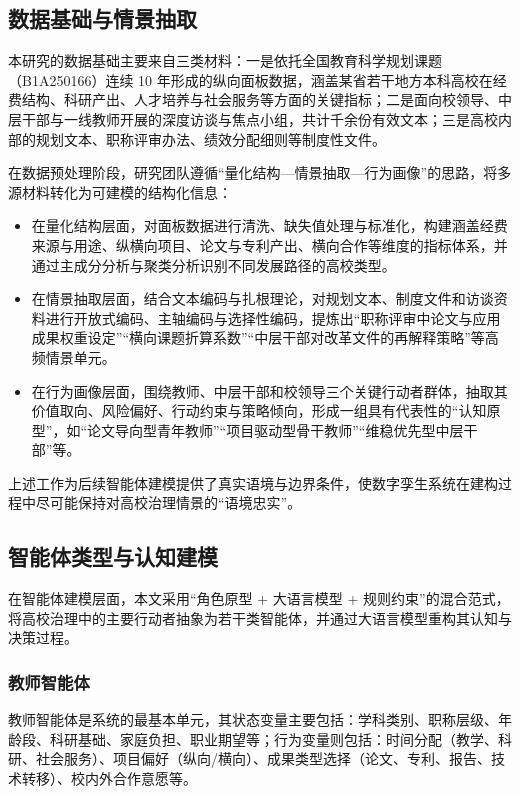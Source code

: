 \documentclass[UTF8, zihao=-4, fontset=mac]{ctexart}
\begin{document}
\subsection{数据基础与情景抽取}

本研究的数据基础主要来自三类材料：一是依托全国教育科学规划课题（B1A250166）连续 10 年形成的纵向面板数据，涵盖某省若干地方本科高校在经费结构、科研产出、人才培养与社会服务等方面的关键指标；二是面向校领导、中层干部与一线教师开展的深度访谈与焦点小组，共计千余份有效文本；三是高校内部的规划文本、职称评审办法、绩效分配细则等制度性文件。

在数据预处理阶段，研究团队遵循“量化结构—情景抽取—行为画像”的思路，将多源材料转化为可建模的结构化信息：

\begin{itemize}
    \item 在量化结构层面，对面板数据进行清洗、缺失值处理与标准化，构建涵盖经费来源与用途、纵横向项目、论文与专利产出、横向合作等维度的指标体系，并通过主成分分析与聚类分析识别不同发展路径的高校类型。
    \item 在情景抽取层面，结合文本编码与扎根理论，对规划文本、制度文件和访谈资料进行开放式编码、主轴编码与选择性编码，提炼出“职称评审中论文与应用成果权重设定”“横向课题折算系数”“中层干部对改革文件的再解释策略”等高频情景单元。
    \item 在行为画像层面，围绕教师、中层干部和校领导三个关键行动者群体，抽取其价值取向、风险偏好、行动约束与策略倾向，形成一组具有代表性的“认知原型”，如“论文导向型青年教师”“项目驱动型骨干教师”“维稳优先型中层干部”等。
\end{itemize}

上述工作为后续智能体建模提供了真实语境与边界条件，使数字孪生系统在建构过程中尽可能保持对高校治理情景的“语境忠实”。

\subsection{智能体类型与认知建模}

在智能体建模层面，本文采用“角色原型 + 大语言模型 + 规则约束”的混合范式，将高校治理中的主要行动者抽象为若干类智能体，并通过大语言模型重构其认知与决策过程\cite{park2023generative, hong2023metagpt, sumers2023cognitive, wang2024survey}。

\subsubsection{教师智能体}

教师智能体是系统的最基本单元，其状态变量主要包括：学科类别、职称层级、年龄段、科研基础、家庭负担、职业期望等；行为变量则包括：时间分配（教学、科研、社会服务）、项目偏好（纵向/横向）、成果类型选择（论文、专利、报告、技术转移）、校内外合作意愿等。
\end{document}

